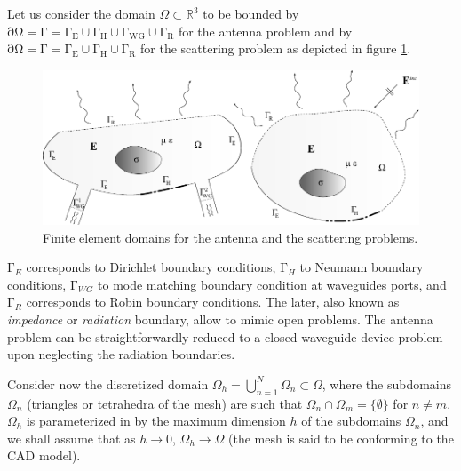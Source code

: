 Let us consider the domain $\Omega \subset \mathbb{R}^3$ to be bounded by $\mathrm{\partial \Omega = \Gamma = \Gamma_E \cup \Gamma_{H} \cup \Gamma_{WG} \cup \Gamma_R}$ for the antenna problem and by $\mathrm{\partial \Omega = \Gamma = \Gamma_E \cup \Gamma_{H} \cup \Gamma_R}$ for the scattering problem as depicted in figure \ref{fig:FEMproblem}.
\begin{figure}[hbpt!]
\centering
\includegraphics[width=12cm]{FEMproblem} 
\caption{Finite element domains for the antenna and the  scattering problems.}
\label{fig:FEMproblem}
\end{figure}

$\mathrm{\Gamma}_E$ corresponds to Dirichlet boundary conditions, $\mathrm{\Gamma}_H$ to Neumann boundary conditions, $\mathrm{\Gamma}_{WG}$ to mode matching boundary condition at waveguides ports, and $\mathrm{\Gamma}_R$ corresponds to Robin boundary conditions. The later, also known as \textit{impedance} or \textit{radiation} boundary, allow to mimic open problems. The antenna problem can be straightforwardly reduced to a closed waveguide device problem upon neglecting the radiation boundaries.

Consider now the discretized domain $\Omega_h = \bigcup_{n=1}^{N} \Omega_n \subset \Omega$, where the subdomains $\Omega_n$ (triangles or tetrahedra of the mesh) are such that $\Omega_n \cap \Omega_m = \{ \emptyset \}$ for $n \neq m$. $\Omega_h$ is parameterized in by the maximum dimension $h$ of the subdomains $\Omega_n$, and we shall assume that as $h \to 0$, $\Omega_h \to \Omega$ (the mesh is said to be conforming to the CAD model).

